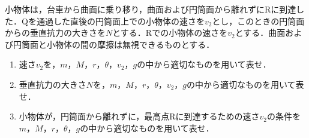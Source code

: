 小物体は，台車から曲面に乗り移り，曲面および円筒面から離れずにRに到達した．Qを通過した直後の円筒面上での小物体の速さを$v_2$とし，このときの円筒面からの垂直抗力の大きさを$N$とする．Rでの小物体の速さを$v_2$とする．曲面および円筒面と小物体の間の摩擦は無視できるものとする．
\begin{enumerate}[resume, label={\textbf{問\arabic*}}]
  \item {\hzw}速さ$v_2$を，$m$，$M$，$r$，$\theta$，$v_2$，$g$の中から適切なものを用いて表せ．
  \item {\hzw}垂直抗力の大きさ$N$を，$m$，$M$，$r$，$\theta$，$v_2$，$g$の中から適切なものを用いて表せ．
  \item {\hzw}小物体が，円筒面から離れずに，最高点Rに到達するための速さ$v_2$の条件を$m$，$M$，$r$，$\theta$，$g$の中から適切なものを用いて表せ．
\end{enumerate}
